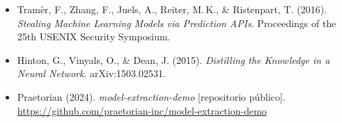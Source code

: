 \documentclass[11pt,a4paper]{article}
\begin{document}
\begin{itemize}
  \item Tramèr, F., Zhang, F., Juels, A., Reiter, M.\,K., \& Ristenpart, T. (2016). \textit{Stealing Machine Learning Models via Prediction APIs}. Proceedings of the 25th USENIX Security Symposium.

  \item Hinton, G., Vinyals, O., \& Dean, J. (2015). \textit{Distilling the Knowledge in a Neural Network}. arXiv:1503.02531.

  \item Praetorian (2024). \textit{model-extraction-demo} [repositorio público]. \url{https://github.com/praetorian-inc/model-extraction-demo}
\end{itemize}
\end{document}
